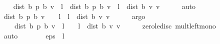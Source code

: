\begin{isabellebody}
\isanewline
\ \ \isamarkupfalse%
\ {\isachardoublequoteopen}dist\ {\isacharparenleft}{\kern0pt}{\isasymnu}\isactrlsub b\ {\isacharquery}{\kern0pt}p{\isacharparenright}{\kern0pt}\ {\isacharparenleft}{\kern0pt}{\isasymL}\isactrlsub b\ v{\isacharparenright}{\kern0pt}\ {\isacharminus}{\kern0pt}\ l\ {\isacharasterisk}{\kern0pt}\ dist\ {\isacharparenleft}{\kern0pt}{\isasymnu}\isactrlsub b\ {\isacharquery}{\kern0pt}p{\isacharparenright}{\kern0pt}\ {\isacharparenleft}{\kern0pt}{\isasymL}\isactrlsub b\ v{\isacharparenright}{\kern0pt}\ {\isasymle}\ l\ {\isacharasterisk}{\kern0pt}\ dist\ {\isacharparenleft}{\kern0pt}{\isasymL}\isactrlsub b\ v{\isacharparenright}{\kern0pt}\ v{\isachardoublequoteclose}\isanewline
\ \ \ \ \isamarkupfalse%
\ auto\isanewline
\ \ \isamarkupfalse%
\ {\isachardoublequoteopen}dist\ {\isacharparenleft}{\kern0pt}{\isasymnu}\isactrlsub b\ {\isacharquery}{\kern0pt}p{\isacharparenright}{\kern0pt}\ {\isacharparenleft}{\kern0pt}{\isasymL}\isactrlsub b\ v{\isacharparenright}{\kern0pt}\ {\isacharasterisk}{\kern0pt}\ {\isacharparenleft}{\kern0pt}{}\ {\isacharminus}{\kern0pt}\ l{\isacharparenright}{\kern0pt}\ {\isasymle}\ l\ {\isacharasterisk}{\kern0pt}\ dist\ {\isacharparenleft}{\kern0pt}{\isasymL}\isactrlsub b\ v{\isacharparenright}{\kern0pt}\ v{\isachardoublequoteclose}\isanewline
\ \ \ \ \isamarkupfalse%
\ argo\isanewline
\ \ \isamarkupfalse%
\ \ {\isachardoublequoteopen}{}\ {\isacharasterisk}{\kern0pt}\ dist\ {\isacharparenleft}{\kern0pt}{\isasymnu}\isactrlsub b\ {\isacharquery}{\kern0pt}p{\isacharparenright}{\kern0pt}\ {\isacharparenleft}{\kern0pt}{\isasymL}\isactrlsub b\ v{\isacharparenright}{\kern0pt}\ {\isacharasterisk}{\kern0pt}\ {\isacharparenleft}{\kern0pt}{}{\isacharminus}{\kern0pt}l{\isacharparenright}{\kern0pt}\ {\isasymle}\ {}\ {\isacharasterisk}{\kern0pt}\ {\isacharparenleft}{\kern0pt}l\ {\isacharasterisk}{\kern0pt}\ dist\ {\isacharparenleft}{\kern0pt}{\isasymL}\isactrlsub b\ v{\isacharparenright}{\kern0pt}\ v{\isacharparenright}{\kern0pt}{\isachardoublequoteclose}\isanewline
\ \ \ \ \isamarkupfalse%
\ zero{\isacharunderscore}{\kern0pt}le{\isacharunderscore}{\kern0pt}disc\ mult{\isacharunderscore}{\kern0pt}left{\isacharunderscore}{\kern0pt}mono\ \isanewline
\ \ \ \ \isamarkupfalse%
\ auto\isanewline
\ \ \isamarkupfalse%
\ \isamarkupfalse%
\ {\isachardoublequoteopen}{\isasymdots}\ {\isasymle}\ eps\ {\isacharasterisk}{\kern0pt}\ {\isacharparenleft}{\kern0pt}{}{\isacharminus}{\kern0pt}l{\isacharparenright}{\kern0pt}{\isachardoublequoteclose}\isanewline

\end{isabellebody}
